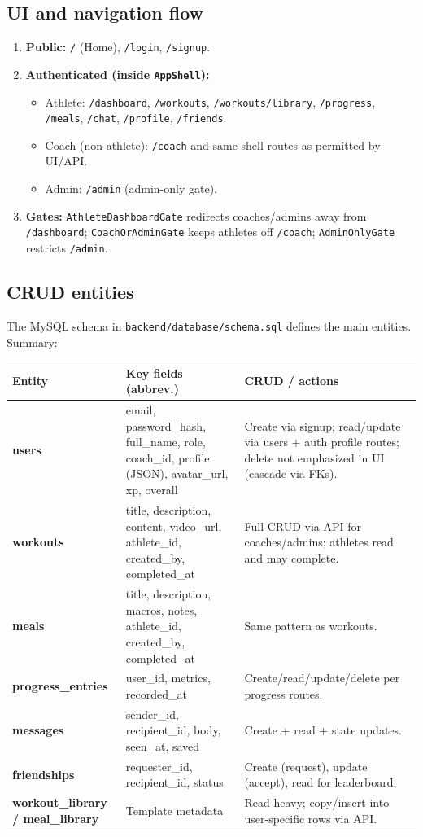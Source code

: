 \documentclass[11pt,letterpaper]{article}
\begin{document}
\subsection{UI and navigation flow}
\begin{enumerate}[nosep]
  \item \textbf{Public:} \texttt{/} (Home), \texttt{/login}, \texttt{/signup}.
  \item \textbf{Authenticated (inside \texttt{AppShell}):}
    \begin{itemize}[nosep]
      \item Athlete: \texttt{/dashboard}, \texttt{/workouts}, \texttt{/workouts/library}, \texttt{/progress}, \texttt{/meals}, \texttt{/chat}, \texttt{/profile}, \texttt{/friends}.
      \item Coach (non-athlete): \texttt{/coach} and same shell routes as permitted by UI/API.
      \item Admin: \texttt{/admin} (admin-only gate).
    \end{itemize}
  \item \textbf{Gates:} \texttt{AthleteDashboardGate} redirects coaches/admins away from \texttt{/dashboard}; \texttt{CoachOrAdminGate} keeps athletes off \texttt{/coach}; \texttt{AdminOnlyGate} restricts \texttt{/admin}.
\end{enumerate}

\subsection{CRUD entities}
The MySQL schema in \texttt{backend/database/schema.sql} defines the main entities. Summary:

\begin{longtable}{@{}p{1.15in}p{2.05in}p{3.2in}@{}}
  \toprule
  \textbf{Entity} & \textbf{Key fields (abbrev.)} & \textbf{CRUD / actions} \\
  \midrule
  \endhead
  \textbf{users} & email, password\_hash, full\_name, role, coach\_id, profile (JSON), avatar\_url, xp, overall & Create via signup; read/update via users + auth profile routes; delete not emphasized in UI (cascade via FKs). \\
  \textbf{workouts} & title, description, content, video\_url, athlete\_id, created\_by, completed\_at & Full CRUD via API for coaches/admins; athletes read and may complete. \\
  \textbf{meals} & title, description, macros, notes, athlete\_id, created\_by, completed\_at & Same pattern as workouts. \\
  \textbf{progress\_entries} & user\_id, metrics, recorded\_at & Create/read/update/delete per progress routes. \\
  \textbf{messages} & sender\_id, recipient\_id, body, seen\_at, saved & Create + read + state updates. \\
  \textbf{friendships} & requester\_id, recipient\_id, status & Create (request), update (accept), read for leaderboard. \\
  \textbf{workout\_library / meal\_library} & Template metadata & Read-heavy; copy/insert into user-specific rows via API. \\
  \bottomrule
\end{longtable}
\end{document}
